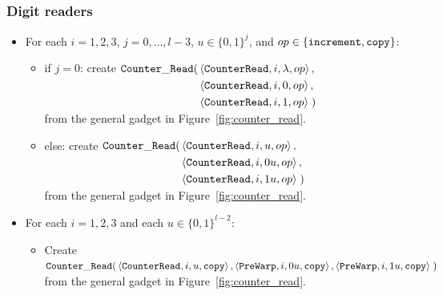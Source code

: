 \subsubsection{ Digit readers }

\begin{itemize}
%
\item For each $i = 1,2,3$,
               $j = 0,\ldots,l-3$,
               $u \in \{0, 1\}^j$, and
               $op \in \{{\tt increment}, {\tt copy} \}$:
    \begin{itemize}
        \item if $j = 0$:
        create
        $\begin{aligned}[t]
            {\tt Counter\_Read}(& \left\langle {\tt CounterRead}, i, \lambda, op \right\rangle, \\
                   & \left\langle {\tt CounterRead}, i, 0,      op \right\rangle, \\
                   & \left\langle {\tt CounterRead}, i, 1,      op \right\rangle \;)
        \end{aligned}$\\ from the general gadget in Figure~\ref{fig:counter_read}.

        \item else:
        create $\begin{aligned}[t]
        {\tt Counter\_Read}(& \left\langle {\tt CounterRead}, i, u,  op \right\rangle, \\
               & \left\langle {\tt CounterRead}, i, 0u, op \right\rangle, \\
               & \left\langle {\tt CounterRead}, i, 1u, op \right\rangle \;)
        \end{aligned}$\\ from the general gadget in Figure~\ref{fig:counter_read}.
    \end{itemize}

\end{itemize}


\begin{itemize}

    \item For each $i = 1,2,3$ and each $u \in \{0, 1\}^{l-2}$:

    \begin{itemize}
        \item Create $\begin{aligned}[t]
            {\tt Counter\_Read}(& \left\langle {\tt CounterRead}, i,  u, {\tt copy} \right\rangle,
                     \left\langle {\tt PreWarp},     i, 0u, {\tt copy} \right\rangle,
                     \left\langle {\tt PreWarp},     i, 1u, {\tt copy} \right\rangle \;)
        \end{aligned}$\\from the general gadget in Figure~\ref{fig:counter_read}.
    \end{itemize}
\end{itemize}

